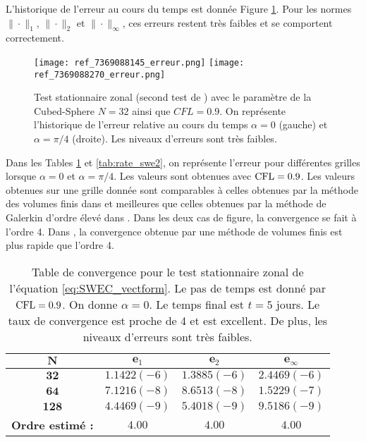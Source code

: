 L'historique de l'erreur au cours du temps est donnée Figure \ref{fig: williamson 2 erreur}. Pour les normes $\| \cdot \|_1$, $\| \cdot \|_2$ et $\| \cdot \|_{\infty}$, ces erreurs restent très faibles et se comportent correctement.

\begin{figure}[htbp]
\begin{center}
\texttt{[image: ref\_7369088145\_erreur.png]}
\texttt{[image: ref\_7369088270\_erreur.png]}
\end{center}
\caption{Test stationnaire zonal (second test de \cite{Williamson1992}) avec le paramètre de la Cubed-Sphere $N=32$ ainsi que $CFL=0.9$. On représente l'historique de l'erreur relative au cours du temps $\alpha = 0$ (gauche) et $\alpha = \pi/4$ (droite). Les niveaux d'erreurs sont très faibles.}
\label{fig: williamson 2 erreur}
\end{figure}

Dans les Tables \ref{tab:rate_swe1} et \ref{tab:rate_swe2}, on représente l'erreur pour différentes grilles lorsque $\alpha = 0$ et $\alpha = \pi/4$. Les valeurs sont obtenues avec $\text{CFL} = 0.9$. Les valeurs obtenues sur une grille donnée sont comparables à celles obtenues par la méthode des volumes finis dans \cite{Chen2008} et meilleures que celles obtenues par la méthode de Galerkin d'ordre élevé dans \cite{Kuang2016}. Dans les deux cas de figure, la convergence se fait à l'ordre 4. Dans \cite{Ullrich2011}, la convergence obtenue par une méthode de volumes finis est plus rapide que l'ordre 4. 

\begin{table}[htbp]
\begin{center}
\begin{tabular}{|c||c|c|c|}
\hline 
$\mathbf{N}$ & $\mathbf{e}_1$ & $\mathbf{e}_2$ & $\mathbf{e}_{\infty}$\\ 
\hline 
\hline 
$\mathbf{32}$ & $1.1422(-6)$ & $1.3885(-6)$ & $2.4469(-6)$\\ 

$\mathbf{64}$ & $7.1216(-8)$ & $8.6513(-8)$ & $1.5229(-7)$\\ 

$\mathbf{128}$ & $4.4469(-9)$ & $5.4018(-9)$ & $9.5186(-9)$\\

\hline
\textbf{Ordre estimé :} & $4.00$ & $4.00$ & $4.00$\\ 
\hline
\end{tabular} 
\end{center}
\caption{Table de convergence pour le test stationnaire zonal de l'équation \eqref{eq:SWEC_vectform}. Le pas de temps est donné par $\text{CFL}=0.9$. On donne $\alpha = 0$. Le temps final est $t=5$ jours. Le taux de convergence est proche de 4 et est excellent. De plus, les niveaux d'erreurs sont très faibles.}
\label{tab:rate_swe1}
\end{table}

